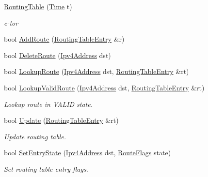 \begin{DoxyCompactItemize}
\item 
\hyperlink{classns3_1_1aodv_1_1RoutingTable_a74e9e1ae844112b788e78bc26d8a593a}{Routing\+Table} (\hyperlink{classns3_1_1Time}{Time} t)
\begin{DoxyCompactList}\small\item\em c-\/tor \end{DoxyCompactList}\item 
bool \hyperlink{classns3_1_1aodv_1_1RoutingTable_a579e562e38e67d510de1ff2c87806c76}{Add\+Route} (\hyperlink{classns3_1_1aodv_1_1RoutingTableEntry}{Routing\+Table\+Entry} \&r)
\item 
bool \hyperlink{classns3_1_1aodv_1_1RoutingTable_aec4efdf9faa7e90a825879bc86cc813a}{Delete\+Route} (\hyperlink{classns3_1_1Ipv4Address}{Ipv4\+Address} dst)
\item 
bool \hyperlink{classns3_1_1aodv_1_1RoutingTable_a90cbc8a2c65cd68ccdaf768fcbb5d723}{Lookup\+Route} (\hyperlink{classns3_1_1Ipv4Address}{Ipv4\+Address} dst, \hyperlink{classns3_1_1aodv_1_1RoutingTableEntry}{Routing\+Table\+Entry} \&rt)
\item 
bool \hyperlink{classns3_1_1aodv_1_1RoutingTable_a2ca8c3757223d681d4cc39e2028fa7ad}{Lookup\+Valid\+Route} (\hyperlink{classns3_1_1Ipv4Address}{Ipv4\+Address} dst, \hyperlink{classns3_1_1aodv_1_1RoutingTableEntry}{Routing\+Table\+Entry} \&rt)
\begin{DoxyCompactList}\small\item\em Lookup route in V\+A\+L\+ID state. \end{DoxyCompactList}\item 
bool \hyperlink{classns3_1_1aodv_1_1RoutingTable_a39fb5335110164f4c1b97682a3812dc1}{Update} (\hyperlink{classns3_1_1aodv_1_1RoutingTableEntry}{Routing\+Table\+Entry} \&rt)
\begin{DoxyCompactList}\small\item\em Update routing table. \end{DoxyCompactList}\item 
bool \hyperlink{classns3_1_1aodv_1_1RoutingTable_aa499b2d27905d720254259451ec29951}{Set\+Entry\+State} (\hyperlink{classns3_1_1Ipv4Address}{Ipv4\+Address} dst, \hyperlink{group__aodv_ga44216921a9c725a5ab8bc19059052a26}{Route\+Flags} state)
\begin{DoxyCompactList}\small\item\em Set routing table entry flags. \end{DoxyCompactList}\item 

\end{DoxyCompactItemize}
